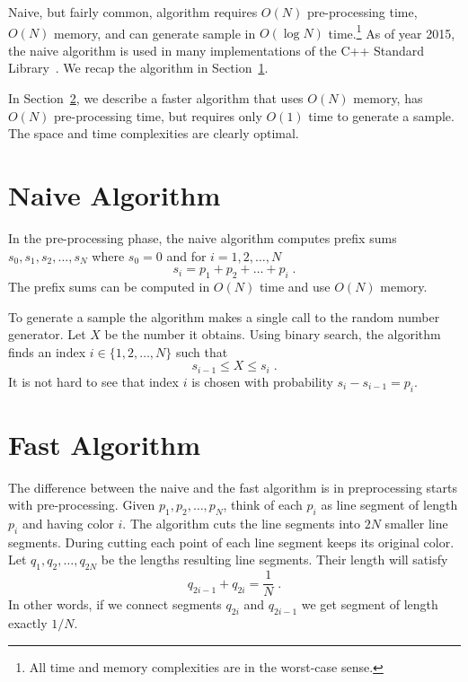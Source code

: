 \documentclass{article}
\begin{document}
Naive, but fairly common, algorithm requires $O(N)$ pre-processing time, $O(N)$
memory, and can generate sample in $O(\log N)$ time.\footnote{All time and
memory complexities are in the worst-case sense.} As of year 2015, the naive
algorithm is used in many implementations of the C++ Standard
Library~\cite{STL}.  We recap the algorithm in
Section~\ref{section:naive-algorithm}.

In Section~\ref{section:fast-algorithm}, we describe a faster algorithm that
uses $O(N)$ memory, has $O(N)$ pre-processing time, but requires only $O(1)$
time to generate a sample.  The space and time complexities are clearly
optimal.

\section{Naive Algorithm}
\label{section:naive-algorithm}

In the pre-processing phase, the naive algorithm computes prefix sums $s_0,
s_1, s_2, \dots, s_N$ where $s_0 = 0$ and for $i=1,2,\dots,N$
$$
s_i = p_1 + p_2 + \dots + p_i \; .
$$
The prefix sums can be computed in $O(N)$ time and use $O(N)$ memory.

To generate a sample the algorithm makes a single call to the random number
generator. Let $X$ be the number it obtains. Using
binary search, the algorithm finds an index $i \in \{1,2,\dots,N\}$ such that
$$
s_{i-1} \le X \le s_i \; .
$$
It is not hard to see that index $i$ is chosen with probability $s_i - s_{i-1}
= p_i$.

\section{Fast Algorithm}
\label{section:fast-algorithm}

The difference between the naive and the fast algorithm is in preprocessing
starts with pre-processing.  Given $p_1, p_2, \dots, p_N$, think of each $p_i$
as line segment of length $p_i$ and having color $i$.  The algorithm cuts the
line segments into $2N$ smaller line segments. During cutting each point of each
line segment keeps its original color. Let $q_1, q_2, \dots, q_{2N}$ be the
lengths resulting line segments. Their length will satisfy
\begin{equation}
\label{equation:two-segments}
q_{2i - 1} + q_{2i} = \frac{1}{N} \; .
\end{equation}
In other words, if we connect segments $q_{2i}$ and $q_{2i-1}$ we get
segment of length exactly $1/N$.
\end{document}
